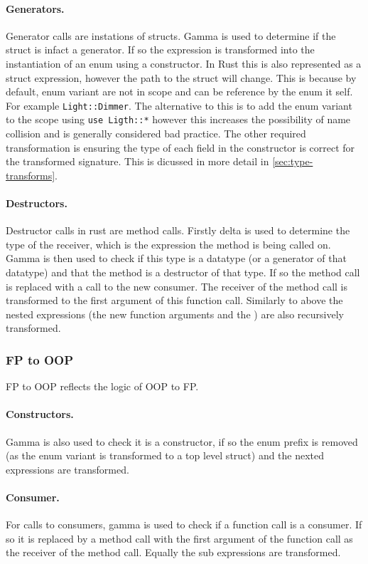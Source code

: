 \documentclass[ oneside,%
                    author={James Elgar},
                    degree={MEng},
                     title={Bidirectional transformer between functional and \\ object-oriented programming in Rust},
                  subtitle={}]{dissertation}
\newcommand{\rust}[1]{\texttt{#1}}
\begin{document}
\paragraph{Generators. } Generator calls are instations of structs. Gamma is used to determine if the struct is infact a generator. If so the expression is transformed into the instantiation of an enum using a constructor. In Rust this is also represented as a struct expression, however the path to the struct will change. This is because by default, enum variant are not in scope and can be reference by the enum it self. For example \rust{Light::Dimmer}. The alternative to this is to add the enum variant to the scope using \rust{use Ligth::*} however this increases the possibility of name collision and is generally considered bad practice. The other required transformation is ensuring the type of each field in the constructor is correct for the transformed signature. This is dicussed in more detail in \autoref{sec:type-transforms}.

\paragraph{Destructors. } Destructor calls in rust are method calls. Firstly delta is used to determine the type of the receiver, which is the expression the method is being called on. Gamma is then used to check if this type is a datatype (or a generator of that datatype) and that the method is a destructor of that type. If so the method call is replaced with a call to the new consumer. The receiver of the method call is transformed to the first argument of this function call. Similarly to above the nested expressions (the new function arguments and the ) are also recursively transformed.

\subsubsection{FP to OOP}

FP to OOP reflects the logic of OOP to FP.

\paragraph{Constructors. }  Gamma is also used to check it is a constructor, if so the enum prefix is removed (as the enum variant is transformed to a top level struct) and the nexted expressions are transformed.

\paragraph{Consumer. } For calls to consumers, gamma is used to check if a function call is a consumer. If so it is replaced by a method call with the first argument of the function call as the receiver of the method call. Equally the sub expressions are transformed.
\end{document}
